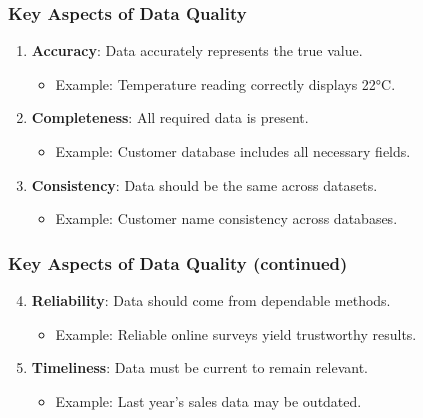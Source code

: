 \documentclass[aspectratio=169]{beamer}
\begin{document}
\begin{frame}
    \frametitle{Key Aspects of Data Quality}
    \begin{enumerate}
        \item \textbf{Accuracy}: Data accurately represents the true value.
            \begin{itemize}
                \item Example: Temperature reading correctly displays 22°C.
            \end{itemize}
        \item \textbf{Completeness}: All required data is present.
            \begin{itemize}
                \item Example: Customer database includes all necessary fields.
            \end{itemize}
        \item \textbf{Consistency}: Data should be the same across datasets.
            \begin{itemize}
                \item Example: Customer name consistency across databases.
            \end{itemize}
    \end{enumerate}
\end{frame}

\begin{frame}
    \frametitle{Key Aspects of Data Quality (continued)}
    \begin{enumerate}
        \setcounter{enumi}{3} %
        \item \textbf{Reliability}: Data should come from dependable methods.
            \begin{itemize}
                \item Example: Reliable online surveys yield trustworthy results.
            \end{itemize}
        \item \textbf{Timeliness}: Data must be current to remain relevant.
            \begin{itemize}
                \item Example: Last year's sales data may be outdated.
            \end{itemize}
    \end{enumerate}
\end{frame}
\end{document}
